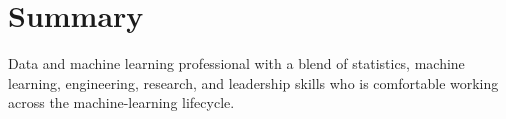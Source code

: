 \documentclass[print]{friggeri-cv} %
\begin{document}
{
  \section{Summary}
  Data and machine learning professional with a blend of statistics, machine
  learning, engineering, research, and leadership skills who is comfortable
  working across the machine-learning lifecycle.  }
\iftoggle{cv}
{\section{Experience}
}
{\section{Selected Experience}
}
\end{document}
